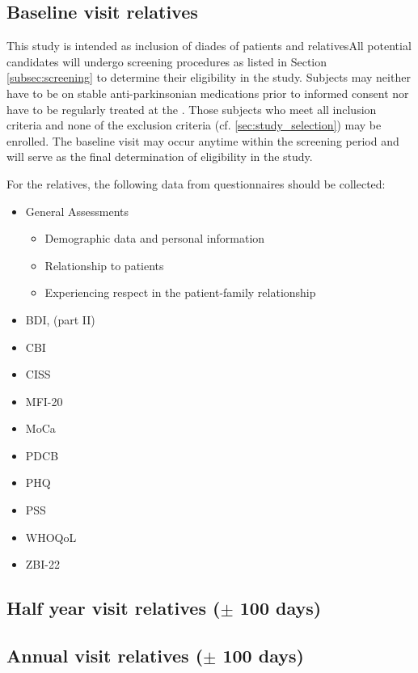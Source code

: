 \subsection{Baseline visit relatives}
This study is intended as inclusion of diades of patients and relativesAll potential candidates will undergo screening procedures as listed in Section \ref{subsec:screening} to determine their eligibility in the study. Subjects may neither have to be on stable anti-parkinsonian medications prior to informed consent nor have to be regularly treated at the \UKGM. Those subjects who meet all inclusion criteria and none of the exclusion criteria (cf. \ref{sec:study_selection}) may be enrolled. The baseline visit may occur anytime within the screening period and will serve as the final  determination of eligibility in the study. 

For the relatives, the following data from questionnaires should be collected:
\begin{itemize}
\item General Assessments
\begin{itemize}
\item Demographic data and personal information
\item Relationship to patients
\item Experiencing respect in the patient-family relationship
\end{itemize}
\item \acl{BDI}, (part II)
\item \ac{CBI}
\item \ac{CISS}
\item \ac{MFI-20}
\item \ac{MoCa}
\item \ac{PDCB}
\item \ac{PHQ}
\item \ac{PSS}
\item \ac{WHOQoL}
\item \ac{ZBI-22}
\end{itemize}

\subsection{Half year visit relatives ($\pm$ 100 days)}

\subsection{Annual visit relatives ($\pm$ 100 days)}

